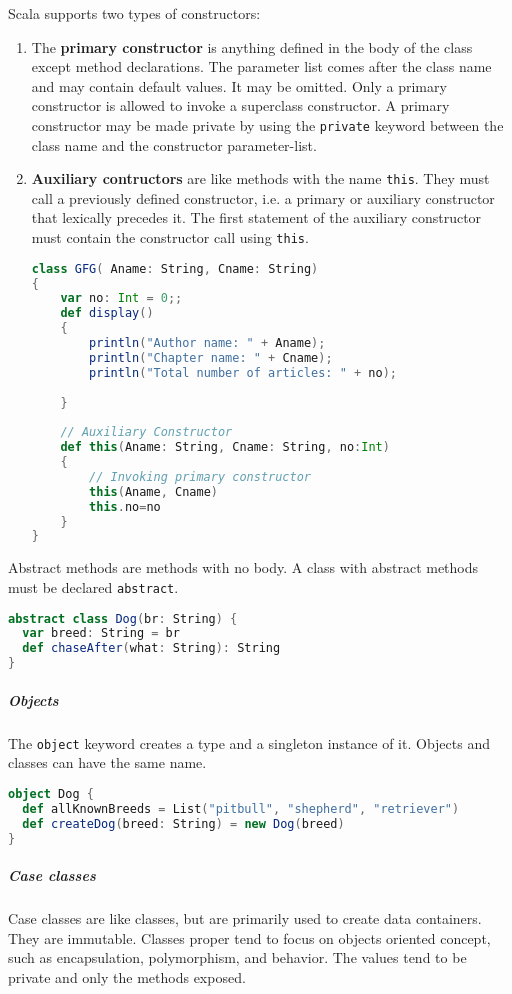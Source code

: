 Scala supports two types of constructors:
\begin{enumerate}
\item The \textbf{primary constructor} is anything defined in the body of the class except method declarations. The parameter list comes after the class name and may contain default values. It may be omitted. Only a primary constructor is allowed to invoke a superclass constructor. A primary constructor may be made private by using the \texttt{private} keyword between the class name and the constructor parameter-list.
\item \textbf{Auxiliary contructors} are like methods with the name \texttt{this}. They must call a previously defined constructor, i.e. a primary or auxiliary constructor that lexically precedes it. The first statement of the auxiliary constructor must contain the constructor call using \texttt{this}.
\begin{lstlisting}[language=scala, style=snippet]
class GFG( Aname: String, Cname: String) 
{ 
    var no: Int = 0;; 
    def display() 
    { 
        println("Author name: " + Aname); 
        println("Chapter name: " + Cname); 
        println("Total number of articles: " + no); 
          
    } 
      
    // Auxiliary Constructor 
    def this(Aname: String, Cname: String, no:Int)  
    { 
        // Invoking primary constructor 
        this(Aname, Cname) 
        this.no=no 
    } 
} 
\end{lstlisting}
\end{enumerate}

Abstract methods are methods with no body. A class with abstract methods must be declared \texttt{abstract}.
\begin{lstlisting}[language=scala, style=snippet]
abstract class Dog(br: String) {
  var breed: String = br
  def chaseAfter(what: String): String
}
\end{lstlisting}

\subparagraph{Objects} The \texttt{object} keyword creates a type and a singleton instance of it. Objects and classes can have the same name.
\begin{lstlisting}[language=scala, style=snippet]
object Dog {
  def allKnownBreeds = List("pitbull", "shepherd", "retriever")
  def createDog(breed: String) = new Dog(breed)
}
\end{lstlisting}

\subparagraph{Case classes} Case classes are like classes, but are primarily used to create data containers. They are immutable. Classes proper tend to focus on objects oriented concept, such as encapsulation, polymorphism, and behavior. The values tend to be private and only the methods exposed.

